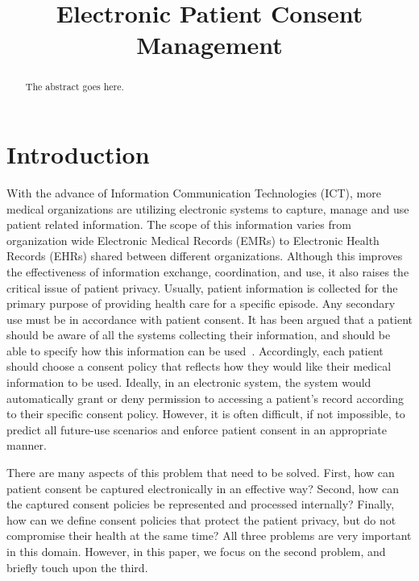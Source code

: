 \documentclass[conference]{IEEEtran}
\begin{document}
\title{Electronic Patient Consent Management}

\author{
}

\maketitle


\begin{abstract}
The abstract goes here.
\end{abstract}



\section{Introduction}
With the advance of Information Communication Technologies (ICT), more medical organizations are utilizing electronic systems to capture, manage and use patient
related information.  The scope of this information varies from organization wide Electronic Medical Records (EMRs) to Electronic Health Records (EHRs) shared
between different organizations.  Although this improves the effectiveness of information exchange, coordination, and use, it also raises the critical issue of
patient privacy. Usually, patient information is collected for the primary purpose of providing health care for a specific episode. Any secondary use must be in
accordance with patient consent.  It has been argued that a patient should be aware of all the systems collecting their information, and should be able to
specify how this information can be used~\cite{kluge2004informed}. Accordingly, each patient should choose a consent policy that reflects how they would like
their medical information to be used. Ideally, in an electronic system, the system would automatically grant or deny permission to
accessing a patient's record according to their specific consent policy. However, it is often difficult, if not impossible, to predict all future-use scenarios
and enforce patient consent in an appropriate manner.

There are many aspects of this problem that need to be solved. First, how can patient consent be captured electronically in an effective way? Second, how can
the captured consent policies be represented and processed internally? Finally, how can we define consent policies that protect the patient privacy, but do not
compromise their health at the same time? All three problems are very important in this domain. However, in this paper, we focus on the second problem, and
briefly touch upon the third.
\end{document}
